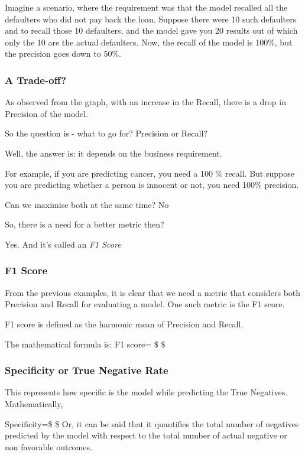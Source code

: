 \documentclass[11pt]{article}
\begin{document}
Imagine a scenario, where the requirement was that the model recalled
all the defaulters who did not pay back the loan. Suppose there were 10
such defaulters and to recall those 10 defaulters, and the model gave
you 20 results out of which only the 10 are the actual defaulters. Now,
the recall of the model is 100\%, but the precision goes down to 50\%.

    \subsubsection{A Trade-off?}\label{a-trade-off}

As observed from the graph, with an increase in the Recall, there is a
drop in Precision of the model.

So the question is - what to go for? Precision or Recall?

Well, the answer is: it depends on the business requirement.

For example, if you are predicting cancer, you need a 100 \% recall. But
suppose you are predicting whether a person is innocent or not, you need
100\% precision.

Can we maximise both at the same time? No

So, there is a need for a better metric then?

Yes. And it's called an \emph{F1 Score}

    \subsubsection{F1 Score}\label{f1-score}

From the previous examples, it is clear that we need a metric that
considers both Precision and Recall for evaluating a model. One such
metric is the F1 score.

F1 score is defined as the harmonic mean of Precision and Recall.

The mathematical formula is: F1 score= \$
 \$

    \subsubsection{Specificity or True Negative
Rate}\label{specificity-or-true-negative-rate}

This represents how specific is the model while predicting the True
Negatives. Mathematically,

Specificity=\$  \$ Or, it can be said that it
quantifies the total number of negatives predicted by the model with
respect to the total number of actual negative or non favorable
outcomes.
\end{document}
